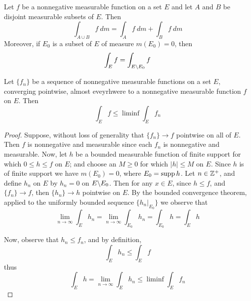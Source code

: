 \begin{theorem}\label{10.2.5}
    Let $f$ be a nonnegative measurable function on a set $E$ and let  $A$ and
    $B$ be disjoint measurable subsets of $E$. Then
    \begin{equation*}
        \int_{A \cup B}{f \ dm}=\int_A{f \ dm}+\int_B{f \ dm}
    \end{equation*}
    Moreover, if $E_0$ is a subset of $E$ of measure $m(E_0)=0$, then
    \begin{equation*}
        \int_E{f}=\int_{E \backslash E_0}{f}
    \end{equation*}
\end{theorem}

\begin{lemma}\label{10.5.6}
    Let $\{f_n\}$ be a sequence of nonnegative measurable functions on a set
    $E$, converging pointwise, almost eveyrhwere to a nonnegative measurable
    function $f$ on $E$. Then
    \begin{equation*}
        \int_E{f} \leq \liminf{\int_E{f_n}}
    \end{equation*}
\end{lemma}
\begin{proof}
    Suppose, without loss of generality that $\{f_n\} \xrightarrow{} f$
    pointwise on all of $E$. Then $f$ is nonnegative and measurable since each
    $f_n$ is nonnegative and measurable. Now, let  $h$ be a bounded measurable
    function of finite support for which  $0 \leq h \leq f$ on  $E$; and choose
    an  $M \geq 0$ for which  $|h| \leq M$ on  $E$. Since $h$ is of finite
    support we have $m (E_0)=0$, where $E_0=\operatorname{supp}{h}$. Let $n \in \mathbb{Z}^+$, and
    define $h_n$ on $E$ by $h_n=0$ on $E \backslash E_0$. Then for any $x \in E$,
    since  $h \leq f$, and $\{f_n\} \xrightarrow{} f$, then $\{h_n\} \xrightarrow{}
    h$ pointwise on $E$. By the bounded convergence theorem, applied to the
    uniformly bounded sequence $\{h_n|_{E_0}\}$ we observe that
    \begin{equation*}
        \lim_{n \xrightarrow{} \infty}{\int_E{h_n}}=
        \lim_{n \xrightarrow{} \infty}{\int_{E_0}{h_n}}=
        \int_{E_0}{h}=\int_E{h}
    \end{equation*}

    Now, observe that $h_n \leq f_n$, and by definition,
    \begin{equation*}
        \int_E{h_n} \leq \int_E{f}
    \end{equation*}
    thus
    \begin{equation*}
        \int_E{h}=
        \lim_{n \xrightarrow{} \infty}\int_E{h_n} \leq
        \liminf{\int_E{f_n}}
    \end{equation*}
\end{proof}

